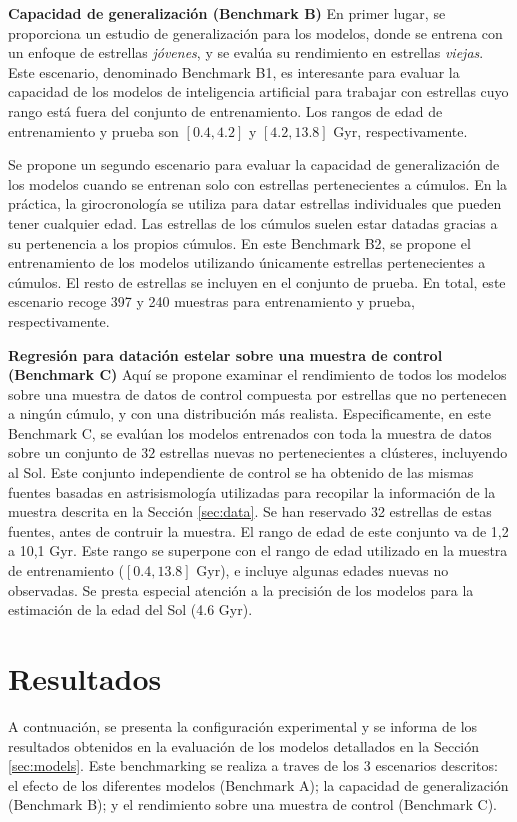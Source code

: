 \textbf{Capacidad de generalización (Benchmark B)} {} En primer lugar, se proporciona un estudio de generalización para los modelos, donde se entrena con un enfoque de estrellas \emph{jóvenes}, y se evalúa su rendimiento en estrellas \emph{viejas}. Este escenario, denominado Benchmark B1, es interesante para evaluar la capacidad de los modelos de inteligencia artificial para trabajar con estrellas cuyo rango está fuera del conjunto de entrenamiento. Los rangos de edad de entrenamiento y prueba son $[0.4,4.2]$ y $[4.2,13.8]$ Gyr, respectivamente.

Se propone un segundo escenario para evaluar la capacidad de generalización de los modelos cuando se entrenan solo con estrellas pertenecientes a cúmulos. En la práctica, la girocronología se utiliza para datar estrellas individuales que pueden tener cualquier edad. Las estrellas de los cúmulos suelen estar datadas gracias a su pertenencia a los propios cúmulos. En este Benchmark B2, se propone el entrenamiento de los modelos utilizando únicamente estrellas pertenecientes a cúmulos. El resto de estrellas se incluyen en el conjunto de prueba. En total, este escenario recoge 397 y 240 muestras para entrenamiento y prueba, respectivamente.

\textbf{Regresión para datación estelar sobre una muestra de control (Benchmark C)} {} Aquí se propone examinar el rendimiento de todos los modelos sobre una muestra de datos de control compuesta por estrellas que no pertenecen a ningún cúmulo, y con una distribución más realista. Especificamente, en este Benchmark C, se evalúan los modelos entrenados con toda la muestra de datos sobre un conjunto de $32$ estrellas nuevas no pertenecientes a clústeres, incluyendo al Sol. Este conjunto independiente de control se ha obtenido de las mismas fuentes basadas en astrisismología utilizadas para recopilar la información de la muestra descrita en la Sección \ref{sec:data}. Se han reservado 32 estrellas de estas fuentes, antes de contruir la muestra. El rango de edad de este conjunto va de 1,2 a 10,1 Gyr. Este rango se superpone con el rango de edad utilizado en la muestra de entrenamiento ($[0.4, 13.8]$ Gyr), e incluye algunas edades nuevas no observadas. Se presta especial atención a la precisión de los modelos para la estimación de la edad del Sol (4.6 Gyr).


\section{Resultados}
\label{sec:results}
A contnuación, se presenta la configuración experimental y se informa de los resultados obtenidos en la evaluación de los modelos detallados en la Sección \ref{sec:models}. Este benchmarking se realiza a traves de los 3 escenarios descritos: el efecto de los diferentes modelos (Benchmark A); la capacidad de generalización (Benchmark B); y el rendimiento sobre una muestra de control (Benchmark C).

